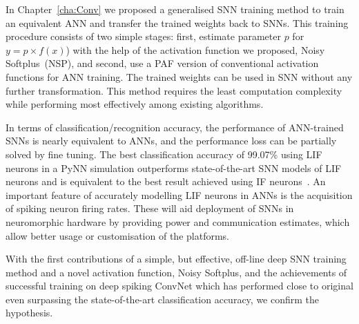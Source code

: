 In Chapter~\ref{cha:Conv} we proposed a generalised SNN training method to train an equivalent ANN and transfer the trained weights back to SNNs.
This training procedure consists of two simple stages: first, estimate parameter $p$ for \protect{} \protect{} $y = p \times f(x)$) with the help of the activation function we proposed, Noisy Softplus~(NSP), and second, use a PAF version of \protect{} conventional activation functions for ANN training. The trained weights can be \protect{} used \protect{} in \protect{} SNN without any further transformation.
This method requires the least computation complexity while performing most effectively among existing algorithms.

In terms of classification/recognition accuracy, the performance of ANN-trained SNNs is nearly equivalent to ANNs, and the performance loss can be partially solved by fine tuning.
The best classification accuracy of 99.07\% using LIF neurons in a PyNN simulation outperforms state-of-the-art SNN models of LIF neurons and is equivalent to the best result achieved using IF neurons~\citep{diehl2015fast}.
An important feature of accurately modelling LIF neurons in ANNs is the acquisition of spiking neuron firing rates. These will aid deployment of SNNs in neuromorphic hardware by providing power and communication estimates, which \protect{} allow better usage or customisation of the platforms.

With the first contributions of a simple, but effective, off-line deep SNN training method and a novel activation function, Noisy Softplus, and the achievements of successful training on \protect{} \protect{} deep spiking ConvNet which has performed close to \protect{} original \protect{} \protect{} even surpassing the state-of-the-art classification accuracy, we confirm the hypothesis. 

